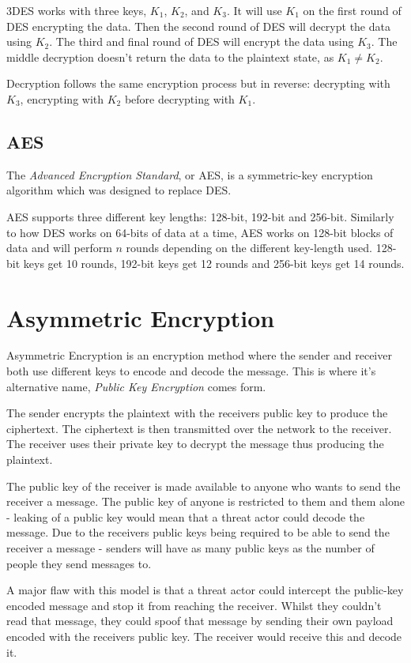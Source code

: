 3DES works with three keys, $K_1$, $K_2$, and $K_3$. It will use $K_1$ on the first round of DES encrypting the data. Then the second round of DES will decrypt the data using $K_2$. The third and final round of DES will encrypt the data using $K_3$. The middle decryption doesn't return the data to the plaintext state, as $K_1 \neq K_2$. 

Decryption follows the same encryption process but in reverse: decrypting with $K_3$, encrypting with $K_2$ before decrypting with $K_1$. 

\subsection{AES}
The \textit{Advanced Encryption Standard}, or AES, is a symmetric-key encryption algorithm which was designed to replace DES.

AES supports three different key lengths: 128-bit, 192-bit and 256-bit. Similarly to how DES works on 64-bits of data at a time, AES works on 128-bit blocks of data and will perform $n$ rounds depending on the different key-length used. 128-bit keys get 10 rounds, 192-bit keys get 12 rounds and 256-bit keys get 14 rounds. 

\section{Asymmetric Encryption}
Asymmetric Encryption is an encryption method where the sender and receiver both use different keys to encode and decode the message. This is where it's alternative name, \textit{Public Key Encryption} comes form.

The sender encrypts the plaintext with the receivers public key to produce the ciphertext. The ciphertext is then transmitted over the network to the receiver. The receiver uses their private key to decrypt the message thus producing the plaintext. 

The public key of the receiver is made available to anyone who wants to send the receiver a message. The public key of anyone is restricted to them and them alone - leaking of a public key would mean that a threat actor could decode the message. Due to the receivers public keys being required to be able to send the receiver a message - senders will have as many public keys as the number of people they send messages to.

A major flaw with this model is that a threat actor could intercept the public-key encoded message and stop it from reaching the receiver. Whilst they couldn't read that message, they could spoof that message by sending their own payload encoded with the receivers public key. The receiver would receive this and decode it. 

